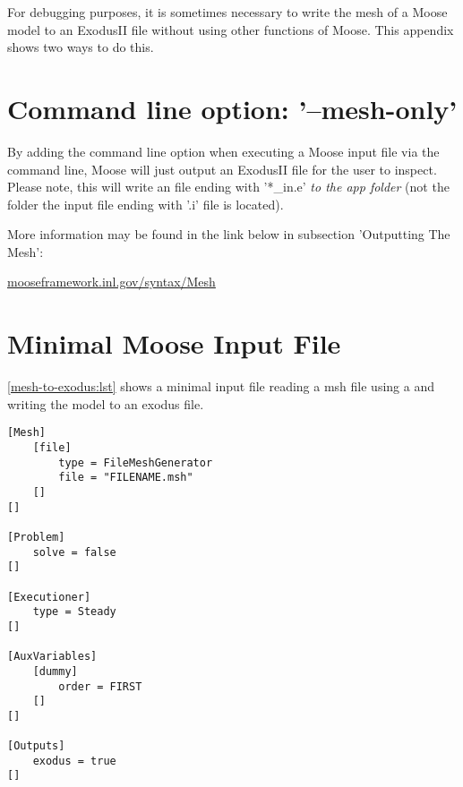 For debugging purposes, it is sometimes necessary to write the mesh of a Moose
model to an ExodusII file without using other functions of Moose. This appendix
shows two ways to do this.

\section{Command line option: '--mesh-only'}

By adding the command line option  when executing a Moose
input file via the command line, Moose will just output an ExodusII file for
the user to inspect. Please note, this will write an file ending with '*\_in.e'
\emph{to the app folder} (not the folder the input file ending with '.i' file
is located).

More information may be found in the link below in subsection 'Outputting The
Mesh':

\href{https://mooseframework.inl.gov/syntax/Mesh/#187a6146-3c09-448f-af5c-6c1230daa1af}{mooseframework.inl.gov/syntax/Mesh}

\section{Minimal Moose Input File}

\autoref{mesh-to-exodus:lst} shows a minimal input file reading a msh file
using a  and writing the model to an exodus file.

\begin{lstlisting}[language=Moose, caption={Read mesh from a file and export to ExodusII},label={mesh-to-exodus:lst}]
[Mesh]
    [file]
        type = FileMeshGenerator
        file = "FILENAME.msh"
    []
[]

[Problem]
    solve = false
[]

[Executioner]
    type = Steady
[]

[AuxVariables]
    [dummy]
        order = FIRST
    []
[]

[Outputs]
    exodus = true
[]
\end{lstlisting}